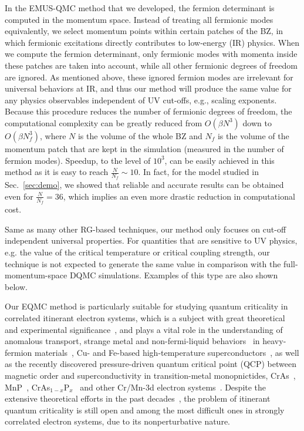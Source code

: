 \documentclass[aps,prx,twocolumn,superscriptaddress,showpacs,floatfix]{revtex4-1}
\begin{document}
In the EMUS-QMC method that we developed, the fermion determinant is computed in the momentum space. Instead of treating all fermionic modes equivalently, we select momentum points within certain patches of the BZ, in which fermionic excitations directly contributes to low-energy (IR) physics. When we compute the fermion determinant, only fermionic modes with momenta inside these patches are taken into account, while all other fermionic degrees of freedom are ignored. As mentioned above, these ignored fermion modes are irrelevant for universal behaviors at IR, and thus our method will produce the same value for any physics observables independent of UV cut-offs, e.g., scaling exponents. Because this procedure reduces the number of fermionic degrees of freedom, the computational complexity can be greatly reduced from $O\left(\beta N^3\right)$ down to $O\left(\beta N_f^3\right)$, where $N$ is the volume of the whole BZ and $N_f$ is the volume of the momentum patch that are kept in the simulation (measured in the number of fermion modes). Speedup, to the level of $10^{3}$, can be  easily achieved in this method as it is easy to reach $\frac{N}{N_f}\sim 10$. In fact, for the model studied in Sec.~\ref{sec:demo}, we showed that reliable and accurate results can be obtained even for $\frac{N}{N_f}=36$, which implies an even more drastic reduction in computational cost.

Same as many other RG-based techniques, our method only focuses on cut-off independent universal properties. For quantities that are sensitive to UV physics, e.g. the value of the critical temperature or critical coupling strength, our technique is not expected to generate the same value  in comparison with the full-momentum-space DQMC simulations. Examples of this type are also shown below.

Our EQMC method is particularly suitable for studying quantum criticality in correlated itinerant electron systems, which is a subject with great theoretical and experimental significance~\cite{Hertz1976,Millis1993,Moriya1985,Stewart2001,Chubukov2004,Belitz2005,Loehneysen2007,Chubukov2009}, and plays a vital role in the understanding of anomalous transport, strange metal and non-fermi-liquid behaviors~\cite{Metzner2003,Senthil2008,Holder2015,Metlitski2015,Xu2017} in heavy-fermion materials~\cite{Custers2003,Steppke2013}, Cu- and Fe-based high-temperature superconductors~\cite{ZhangWenLiang2016,LiuZhaoYu2016,Gu2017}, as well as the recently discovered pressure-driven quantum critical
point (QCP) between magnetic order and superconductivity in transition-metal monopnictides, CrAs~\cite{Wu2014}, MnP~\cite{Cheng2015}, CrAs$_{1-x}$P$_x$~\cite{Matsuda2018} and other Cr/Mn-3d electron systems~\cite{Cheng2017}. Despite the extensive theoretical efforts in the past decades~\cite{Hertz1976,Millis1993,Moriya1985,Abanov2003,Abanov2004,Metlitski2010b,Sur2016,Schlief2017}, the problem of itinerant quantum criticality is still open and among the most difficult ones in strongly correlated electron systems, due to its nonperturbative nature.
\end{document}
